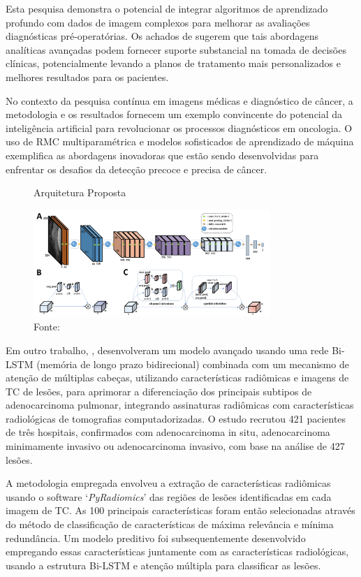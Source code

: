 Esta pesquisa demonstra o potencial de integrar algoritmos de aprendizado profundo com dados de imagem complexos para melhorar as avaliações diagnósticas pré-operatórias. Os achados de  sugerem que tais abordagens analíticas avançadas podem fornecer suporte substancial na tomada de decisões clínicas, potencialmente levando a planos de tratamento mais personalizados e melhores resultados para os pacientes.

No contexto da pesquisa contínua em imagens médicas e diagnóstico de câncer, a metodologia e os resultados fornecem um exemplo convincente do potencial da inteligência artificial para revolucionar os processos diagnósticos em oncologia. O uso de \gls{RMC} multiparamétrica e modelos sofisticados de aprendizado de máquina exemplifica as abordagens inovadoras que estão sendo desenvolvidas para enfrentar os desafios da detecção precoce e precisa de câncer.

\begin{figure}[htbp]
    \centering
    \caption{Arquitetura Proposta}
    \includegraphics[width=0.8\textwidth]{figures/fig007.png}
    \caption*{Fonte: \cite{jiangMRIBasedRadiomics2021}}
    \label{fig:fig007}
\end{figure}

Em outro trabalho, , desenvolveram um modelo avançado usando uma rede Bi-LSTM (memória de longo prazo bidirecional) combinada com um mecanismo de atenção de múltiplas cabeças, utilizando características radiômicas e imagens de \gls{TC} de lesões, para aprimorar a diferenciação dos principais subtipos de adenocarcinoma pulmonar, integrando assinaturas radiômicas com características radiológicas de tomografias computadorizadas. O estudo recrutou 421 pacientes de três hospitais, confirmados com adenocarcinoma in situ, adenocarcinoma minimamente invasivo ou adenocarcinoma invasivo, com base na análise de 427 lesões.

A metodologia empregada envolveu a extração de características radiômicas usando o software `\textit{PyRadiomics}' das regiões de lesões identificadas em cada imagem de \gls{TC}. As 100 principais características foram então selecionadas através do método de classificação de características de máxima relevância e mínima redundância. Um modelo preditivo foi subsequentemente desenvolvido empregando essas características juntamente com as características radiológicas, usando a estrutura Bi-LSTM e atenção múltipla para classificar as lesões.

